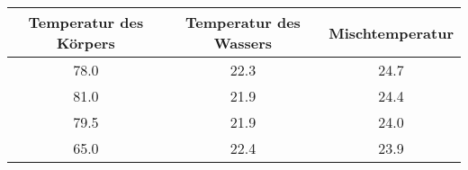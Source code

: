 \begin{center}
\begin{tabular}{c | c | c}
	Temperatur des Körpers & Temperatur des Wassers & Mischtemperatur \\
	\hline
	78.0 & 22.3 & 24.7 \\
	81.0 & 21.9 & 24.4 \\
	79.5 & 21.9 & 24.0 \\
	65.0 & 22.4 & 23.9 \\
\end{tabular}
\end{center}